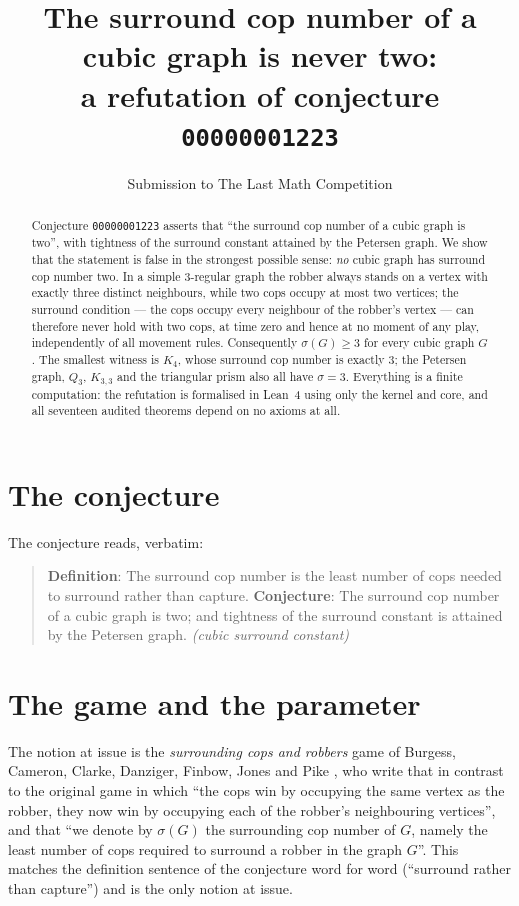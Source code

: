 \documentclass[11pt]{article}
\title{The surround cop number of a cubic graph is never two:\\
a refutation of conjecture \texttt{00000001223}}
\author{Submission to The Last Math Competition}
\date{}
\begin{document}
\maketitle

\begin{abstract}
Conjecture \texttt{00000001223} asserts that ``the surround cop number of a
cubic graph is two'', with tightness of the surround constant attained by the
Petersen graph.  We show that the statement is false in the strongest possible
sense: \emph{no} cubic graph has surround cop number two.  In a simple
3-regular graph the robber always stands on a vertex with exactly three
distinct neighbours, while two cops occupy at most two vertices; the surround
condition --- the cops occupy every neighbour of the robber's vertex --- can
therefore never hold with two cops, at time zero and hence at no moment of any
play, independently of all movement rules.  Consequently
$\sigma(G)\ge 3$ for every cubic graph $G$.  The smallest witness is $K_4$,
whose surround cop number is exactly $3$; the Petersen graph, $Q_3$,
$K_{3,3}$ and the triangular prism also all have $\sigma = 3$.  Everything is
a finite computation: the refutation is formalised in Lean~4 using only the
kernel and core, and all seventeen audited theorems depend on no axioms at all.
\end{abstract}

\section{The conjecture}

The conjecture reads, verbatim:

\begin{quote}
\textbf{Definition}: The surround cop number is the least number of cops
needed to surround rather than capture.  \textbf{Conjecture}: The surround cop
number of a cubic graph is two; and tightness of the surround constant is
attained by the Petersen graph.  \emph{(cubic surround constant)}
\end{quote}

\section{The game and the parameter}

The notion at issue is the \emph{surrounding cops and robbers} game of
Burgess, Cameron, Clarke, Danziger, Finbow, Jones and Pike
\cite{BCCDFJP}, who write that in contrast to the original game in which
``the cops win by occupying the same vertex as the robber, they now win by
occupying each of the robber's neighbouring vertices'', and that
``we denote by $\sigma(G)$ the surrounding cop number of $G$, namely the least
number of cops required to surround a robber in the graph $G$''.  This matches
the definition sentence of the conjecture word for word (``surround rather
than capture'') and is the only notion at issue.
\end{document}
